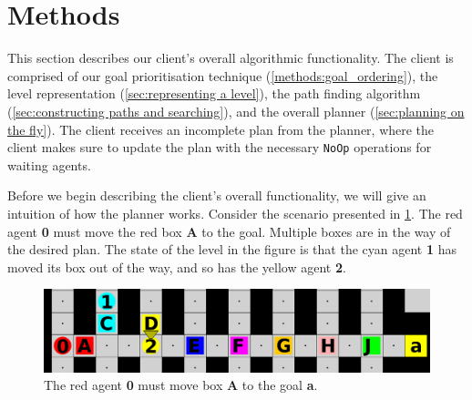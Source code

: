 \section{Methods}
\label{sec:methods}


This section describes our client's overall algorithmic functionality.
The client is comprised of our goal prioritisation technique (\cref{methods:goal_ordering}), the level representation (\cref{sec:representing a level}), the path finding algorithm (\cref{sec:constructing paths and searching}), and the overall planner (\cref{sec:planning on the fly}).
The client receives an incomplete plan from the planner, where the client makes sure to update the plan with the necessary \texttt{NoOp} operations for waiting agents.

Before we begin describing the client's overall functionality, we will give an intuition of how the planner works.
Consider the scenario presented in \cref{fig:intuition example}.
The red agent \textbf{0} must move the red box \textbf{A} to the goal.
Multiple boxes are in the way of the desired plan.
The state of the level in the figure is that the cyan agent \textbf{1} has moved its box out of the way, and so has the yellow agent \textbf{2}.

\begin{figure}[ht!]
  \centering
  \includegraphics[width=.95\columnwidth]{graphics/planner_intuition.png}
  \caption{\label{fig:intuition example}The red agent \textbf{0} must move box \textbf{A} to the goal \textbf{a}.}
\end{figure}

